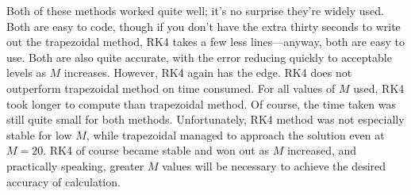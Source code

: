 \documentclass{article}
\begin{document}
\begin{enumerate}[(a)]
    Both of these methods worked quite well; it's no surprise they're widely used. Both are easy to code, though if you don't have the extra thirty seconds to write out the trapezoidal method, RK4 takes a few less lines---anyway, both are easy to use. Both are also quite accurate, with the error reducing quickly to acceptable levels as $M$ increases. However, RK4 again has the edge. RK4 does not outperform trapezoidal method on time consumed. For all values of $M$ used, RK4 took longer to compute than trapezoidal method. Of course, the time taken was still quite small for both methods. Unfortunately, RK4 method was not especially stable for low $M$, while trapezoidal managed to approach the solution even at $M=20$. RK4 of course became stable and won out as $M$ increased, and practically speaking, greater $M$ values will be necessary to achieve the desired accuracy of calculation.


\end{enumerate}
\end{document}
